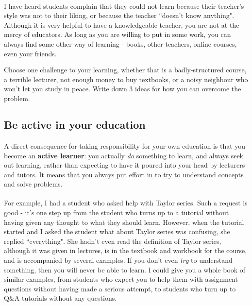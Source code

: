 	\paragraph{}
	I have heard students complain that they could not learn because their teacher's style 
	was not to their liking, or because the teacher ``doesn't know anything". Although it 
	is very helpful to have a knowledgeable teacher, you are not at the mercy of educators.
	As long as you are willing to put in some work, you can always find some other way of learning
	- books, other teachers, online courses, even your friends. 

	\begin{exercise}
	Choose one challenge to your learning, whether that is a badly-structured course, 
	a terrible lecturer, not enough money to buy textbooks, or a noisy neighbour who 
	won't let you study in peace. Write down 3 ideas for how you can overcome the problem.
	\end{exercise}

	\subsection{Be active in your education}
	\paragraph{}
	A direct consequence for taking responsibility for your own education is that you 
	become an \textbf{active learner}: you actually \emph{do} something to learn, 
	and always seek out learning, rather than expecting to have it poured into your
	head by lecturers and tutors. It means that you always put effort in to try to 
	understand concepts and solve problems.
	
	\paragraph{}
	For example, I had a student who asked help with Taylor series. Such a request is
	good - it's one step up from the student who turns up to a tutorial without having
	given any thought to what they should learn. However, when the tutorial started and
	I asked the student what about Taylor series was confusing, she replied ``everything". 
	She hadn't even read the definition of Taylor series, although it was given in lectures,
	is in the textbook and workbook for the course, and is accompanied by several examples.
	If you don't even \emph{try} to understand something, then you will never be able to learn.
	I could give you a whole book of similar examples, from students who expect you to help
	them with assignment questions without having made a serious attempt, to students who turn
	up to Q\&A tutorials without any questions. 
	
